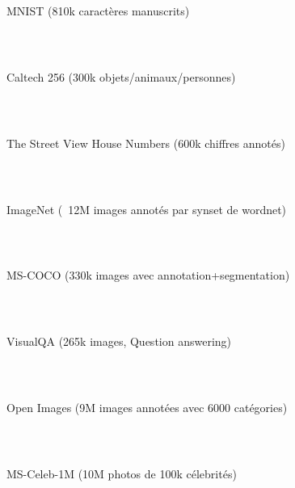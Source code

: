 \begin{frame}
  \frametitle{~}
  MNIST (810k caractères manuscrits)
\end{frame}

\begin{frame}
  \frametitle{~}
  Caltech 256 (300k objets/animaux/personnes)
\end{frame}

\begin{frame}
  \frametitle{~}
  The Street View House Numbers (600k chiffres annotés)
\end{frame}

\begin{frame}
  \frametitle{~}
  ImageNet (~12M images annotés par synset de wordnet)
\end{frame}

\begin{frame}
  \frametitle{~}
  MS-COCO (330k images avec annotation+segmentation)
\end{frame}

\begin{frame}
  \frametitle{~}
  VisualQA (265k images, Question answering)
\end{frame}

\begin{frame}
  \frametitle{~}
  Open Images (9M images annotées avec 6000 catégories)
\end{frame}

\begin{frame}
  \frametitle{~}
  MS-Celeb-1M (10M photos de 100k célebrités)
\end{frame}
